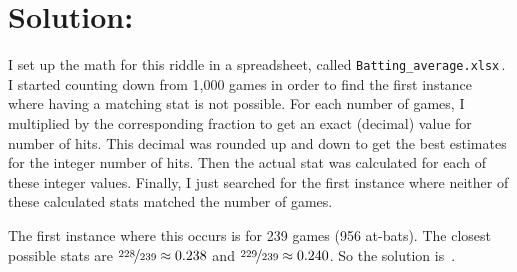 \documentclass{article}
\begin{document}
\section*{Solution:}

I set up the math for this riddle in a spreadsheet, called \texttt{Batting\_average.xlsx}\,.
I started counting down from 1,000 games in order to find the first instance where having a matching stat is not possible.
For each number of games, I multiplied by the corresponding fraction to get an exact (decimal) value for number of hits.
This decimal was rounded up and down to get the best estimates for the integer number of hits.
Then the actual stat was calculated for each of these integer values.
Finally, I just searched for the first instance where neither of these calculated stats matched the number of games.

The first instance where this occurs is for 239 games (956 at-bats).
The closest possible stats are $\nicefrac{228}{239}\approx0.238$ and $\nicefrac{229}{239}\approx0.240$.
So the solution is
\,.
\end{document}
